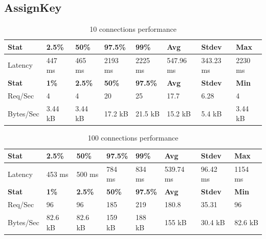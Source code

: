\documentclass[../Main.tex]{subfiles}
\begin{document}
\subsection{AssignKey}
\begin{table}[H]
  \centering
\begin{tabular}{|l|l|l|l|l|l|l|l|}
\hline
\rowcolor[HTML]{f56b00}
\textbf{Stat} & \textbf{2.5\%} & \textbf{50\%} & \textbf{97.5\%} & \textbf{99\%} & \textbf{Avg} & \textbf{Stdev} & \textbf{Max} \\
\hline
Latency & 447 ms & 465 ms & 2193 ms & 2225 ms & 547.96 ms & 343.23 ms & 2230 ms \\
\hline
\rowcolor[HTML]{f56b00}
\textbf{Stat} & \textbf{1\%} & \textbf{2.5\%} & \textbf{50\%} & \textbf{97.5\%} & \textbf{Avg} & \textbf{Stdev} & \textbf{Min} \\
\hline
Req/Sec & 4 & 4 & 20 & 25 & 17.7 & 6.28 & 4 \\
Bytes/Sec & 3.44 kB & 3.44 kB & 17.2 kB & 21.5 kB & 15.2 kB & 5.4 kB & 3.44 kB \\
\hline
\end{tabular}
 \caption{10 connections performance}
 \label{10-connections-performance}
\end{table}

\begin{table}[H]
  \centering
\begin{tabular}{|l|l|l|l|l|l|l|l|}
\hline
\rowcolor[HTML]{f56b00}
\textbf{Stat} & \textbf{2.5\%} & \textbf{50\%} & \textbf{97.5\%} & \textbf{99\%} & \textbf{Avg} & \textbf{Stdev} & \textbf{Max} \\
\hline
Latency & 453 ms & 500 ms & 784 ms & 834 ms & 539.74 ms & 96.42 ms & 1154 ms \\
\hline
\rowcolor[HTML]{f56b00}
\textbf{Stat} & \textbf{1\%} & \textbf{2.5\%} & \textbf{50\%} & \textbf{97.5\%} & \textbf{Avg} & \textbf{Stdev} & \textbf{Min} \\
\hline
Req/Sec & 96 & 96 & 185 & 219 & 180.8 & 35.31 & 96 \\
Bytes/Sec & 82.6 kB & 82.6 kB & 159 kB & 188 kB & 155 kB & 30.4 kB & 82.6 kB \\
\hline
\end{tabular}
 \caption{100 connections performance}
 \label{100-connections-performance}
\end{table}
\end{document}
